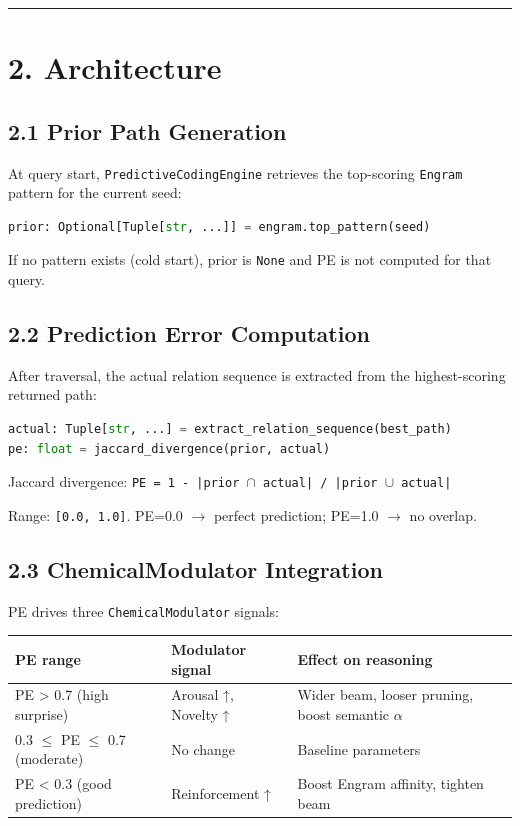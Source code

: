 \medskip\noindent\rule{\linewidth}{0.4pt}\medskip

\section*{2. Architecture}

\subsection*{2.1 Prior Path Generation}

At query start, \texttt{PredictiveCodingEngine} retrieves the top-scoring \texttt{Engram} pattern for the current seed:

\begin{lstlisting}[language=Python]
prior: Optional[Tuple[str, ...]] = engram.top_pattern(seed)
\end{lstlisting}

If no pattern exists (cold start), prior is \texttt{None} and PE is not computed for that query.

\subsection*{2.2 Prediction Error Computation}

After traversal, the actual relation sequence is extracted from the highest-scoring returned path:

\begin{lstlisting}[language=Python]
actual: Tuple[str, ...] = extract_relation_sequence(best_path)
pe: float = jaccard_divergence(prior, actual)
\end{lstlisting}

Jaccard divergence: \texttt{PE = 1 - |prior $\cap$ actual| / |prior $\cup$ actual|}

Range: \texttt{[0.0, 1.0]}. PE=0.0 $\to$ perfect prediction; PE=1.0 $\to$ no overlap.

\subsection*{2.3 ChemicalModulator Integration}

PE drives three \texttt{ChemicalModulator} signals:

\begin{table}[h]
\small\centering
\begin{tabular}{lll}
\toprule
PE range & Modulator signal & Effect on reasoning \\
\midrule
PE > 0.7 (high surprise) & Arousal ↑, Novelty ↑ & Wider beam, looser pruning, boost semantic $\alpha$ \\
0.3 $\leq$ PE $\leq$ 0.7 (moderate) & No change & Baseline parameters \\
PE < 0.3 (good prediction) & Reinforcement ↑ & Boost Engram affinity, tighten beam \\
\bottomrule
\end{tabular}
\end{table}


